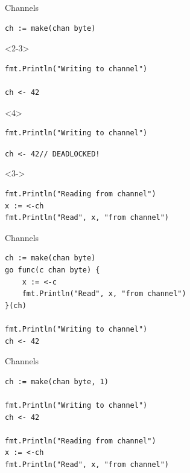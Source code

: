 \documentclass[pdf]{beamer}
\newcommand\z[1]{\texttt{#1}}
\newcommand\blocked[1]{{\color{red}\z{#1}}}
\begin{document}
\begin{frame}[fragile]{Channels}
\begin{lstlisting}
ch := make(chan byte)
\end{lstlisting}
\begin{onlyenv}<2-3>
\begin{lstlisting}
fmt.Println("Writing to channel")

ch <- 42
\end{lstlisting}
\end{onlyenv}
\begin{onlyenv}<4>
\begin{lstlisting}
fmt.Println("Writing to channel")
\end{lstlisting}
\blocked{ch <- 42\qquad\qquad// DEADLOCKED!}
\end{onlyenv}
\begin{onlyenv}<3->
\begin{lstlisting}
fmt.Println("Reading from channel")
x := <-ch
fmt.Println("Read", x, "from channel")
\end{lstlisting}
\end{onlyenv}
\end{frame}

\begin{frame}[fragile]{Channels}
\begin{lstlisting}
ch := make(chan byte)
go func(c chan byte) {
    x := <-c
    fmt.Println("Read", x, "from channel")
}(ch)

fmt.Println("Writing to channel")
ch <- 42
\end{lstlisting}
\end{frame}

\begin{frame}[fragile]{Channels}
\begin{lstlisting}
ch := make(chan byte, 1)

fmt.Println("Writing to channel")
ch <- 42

fmt.Println("Reading from channel")
x := <-ch
fmt.Println("Read", x, "from channel")
\end{lstlisting}
\end{frame}
\end{document}

